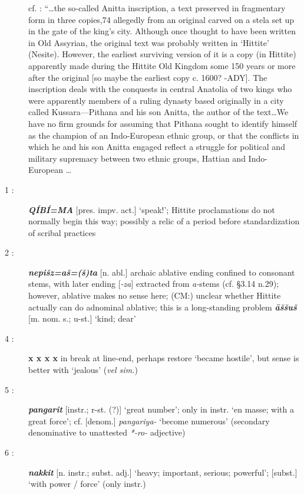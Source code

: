 \documentclass[10pt]{article}
\newcommand{\bit}[1]{\textbf{\textit{#1}}}				%
\newcommand{\p}[1]{{\tiny[{#1}]}}					%
\renewcommand{\.}[1]{\textsubdot{#1}}
\begin{document}
\begin{description}
\smallskip 

cf. \citet[35-36]{bryce2005kingdom}: ``{\ldots}the so-called Anitta inscription, a text preserved in fragmentary form in three copies,74 allegedly from an original carved on a stela set up in the gate of the king's city. Although once thought to have been written in Old Assyrian, the original text was probably written in `Hittite' (Nesite). However, the earliest surviving version of it is a copy (in Hittite) apparently made during the Hittite Old Kingdom some 150 years or more after the original [so maybe the earliest copy c. 1600? -ADY]. The inscription deals with the conquests in central Anatolia of two kings who were apparently members of a ruling dynasty based originally in a city called Kussara---Pithana and his son Anitta, the author of the text{\ldots}We have no firm grounds for assuming that Pithana sought to identify himself as the champion of an Indo-European ethnic group, or that the conflicts in which he and his son Anitta engaged reflect a struggle for political and military supremacy between two ethnic groups, Hattian and Indo-European {\ldots}

\smallskip

\item[1 :] \bit{Q\'IB\'I=MA} \p{pres. impv. act.} `speak!'; Hittite proclamations do not normally begin this way; possibly a relic of a period before standardization of scribal practices

\item[2 :] \bit{nepi\v{s}z=a\v{s}=(\v{s})ta} \p{n. abl.} archaic ablative ending confined to consonant stems, with later ending [\textit{-za}] extracted from \textit{a-}stems (cf.  \S3.14 n.29); however, ablative makes no sense here; (CM:) unclear whether Hittite actually can do adnominal ablative; this is a long-standing problem \bit{\=a\v{s}\v{s}u\v{s}} \p{m. nom. s.; u-st.} `kind; dear'

\item[4 :] \textbf{x x x x} in break at line-end, perhaps restore `became hostile', but sense is better with `jealous' (\textit{vel sim.})

\item[5 :] \bit{pangarit} \p{instr.; r-st. (?)} `great number'; only in instr. `en masse; with a great force'; cf. \p{denom.} \textit{pangariya-} `become numerous' (secondary denominative to unattested \textit{*-ro-} adjective)

\item[6 :] \bit{nakkit} \p{n. instr.; subst. adj.} `heavy; important, serious; powerful'; 
\p{subst.} `with power / force' (only instr.)


\end{description}
\end{document}
